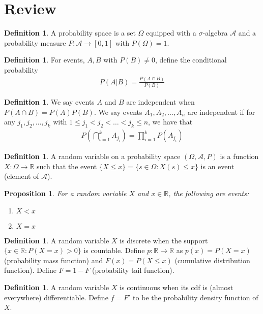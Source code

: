 \documentclass[11pt]{amsart}
\newtheorem{proposition}[theorem]{Proposition}
\theoremstyle{definition}
\newtheorem{definition}[theorem]{Definition}
\numberwithin{equation}{section}
\begin{document}
\section{Review}
\begin{definition}
    A probability space is a set $\Omega$ equipped with a $\sigma$-algebra $\mathcal A$ and a probability measure $ P:\mathcal A\to[0,1]$ with $ P(\Omega)=1$.
\end{definition}
\begin{definition}
    For events, $A,B$ with $P(B)\ne 0$, define the conditional probability
    \begin{align*}
        P(A|B)=\frac{P(A\cap B)}{P(B)}
    \end{align*}
\end{definition}
\begin{definition}
    We say events $A$ and $B$ are independent when $P(A\cap B)=P(A)P(B)$. We say events $A_1,A_2,\ldots,A_n$ are independent if for any $j_1,j_2,\ldots,j_k$ with $1\le j_1<j_2<\ldots<j_k\le n$, we have that 
    \begin{align*}
        P(\bigcap_{i=1}^kA_{j_i})=\prod_{i=1}^kP(A_{j_i})
    \end{align*}
\end{definition}
\begin{definition}
    A random variable on a probability space $(\Omega,\mathcal A,P)$ is a function $X:\Omega\to\mathbb R$ such that the event $\{X\le x\}=\{s\in\Omega:X(s)\le x\}$ is an event (element of $\mathcal A$).
\end{definition}
\begin{proposition}
    For a random variable $X$ and $x\in\mathbb R$, the following are events:
    \begin{enumerate}
        \item $X<x$
        \item $X=x$
    \end{enumerate}
\end{proposition}
\begin{definition}
    A random variable $X$ is discrete when the support $\{x\in\mathbb R:P(X=x)>0\}$ is countable. Define $p:\mathbb R\to\mathbb R$ as $p(x)=P(X=x)$ (probability mass function) and $F(x)=P(X\le x)$ (cumulative distribution function). Define $\overline{F}=1-F$ (probability tail function).
\end{definition}
\begin{definition}
    A random variable $X$ is continuous when its cdf is (almost everywhere) differentiable. Define $f=F'$ to be the probability density function of $X$.
\end{definition}
\end{document}
